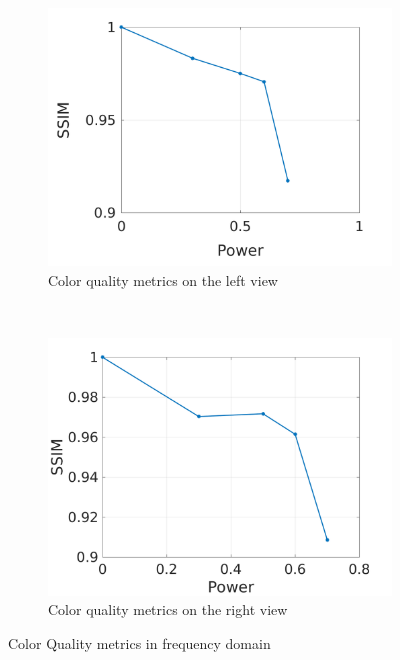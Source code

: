 \begin{figure}[h!]
    \centering
    \begin{subfigure}[t]{0.5\textwidth}
        \centering
\includegraphics[width=1\textwidth]{./img/qm/qm_left.png}
          \caption{\small{Color quality metrics on the left view}}
\label{fig:qmcl}

    \end{subfigure}%
    ~ 
    \begin{subfigure}[t]{0.5\textwidth}
        \centering
\includegraphics[width=1\textwidth]{./img/qm/qm_disp_left.png}
           \caption{\small{Color quality metrics on the right view}}
\label{fig:qmdl}
    \end{subfigure}
    \caption{Color Quality metrics in frequency domain}
    \label{fig:qml}
\end{figure}

